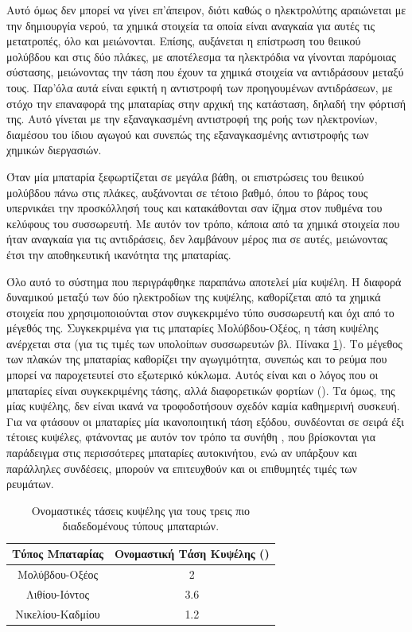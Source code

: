 \documentclass[12pt]{report}
\begin{document}
Αυτό όμως δεν μπορεί να γίνει επ'άπειρον, διότι καθώς ο ηλεκτρολύτης αραιώνεται με την δημιουργία νερού, τα χημικά στοιχεία τα οποία είναι αναγκαία για αυτές τις μετατροπές, όλο και μειώνονται. 
Επίσης, αυξάνεται η επίστρωση του θειικού μολύβδου και στις δύο πλάκες, με αποτέλεσμα τα ηλεκτρόδια να γίνονται παρόμοιας σύστασης, μειώνοντας την τάση που έχουν τα χημικά στοιχεία να αντιδράσουν μεταξύ τους. 
Παρ'όλα αυτά είναι εφικτή η αντιστροφή των προηγουμένων αντιδράσεων, με στόχο την επαναφορά της μπαταρίας στην αρχική της κατάσταση, δηλαδή την φόρτισή της. 
Αυτό γίνεται με την εξαναγκασμένη αντιστροφή της ροής των ηλεκτρονίων, διαμέσου του ίδιου αγωγού και συνεπώς της εξαναγκασμένης αντιστροφής των χημικών διεργασιών. 

Όταν μία μπαταρία ξεφωρτίζεται σε μεγάλα βάθη, οι επιστρώσεις του θειικού μολύβδου πάνω στις πλάκες, αυξάνονται σε τέτοιο βαθμό, όπου το βάρος τους υπερνικάει την προσκόλλησή τους και κατακάθονται σαν ίζημα στον πυθμένα του κελύφους
του συσσωρευτή. Με αυτόν τον τρόπο, κάποια από τα χημικά στοιχεία που ήταν αναγκαία για τις αντιδράσεις, δεν λαμβάνουν μέρος πια σε αυτές, μειώνοντας έτσι την αποθηκευτική ικανότητα της μπαταρίας.

Όλο αυτό το σύστημα που περιγράφθηκε παραπάνω αποτελεί μία κυψέλη. Η διαφορά δυναμικού μεταξύ των δύο ηλεκτροδίων της κυψέλης, καθορίζεται από τα χημικά στοιχεία που χρησιμοποιούνται στον συγκεκριμένο τύπο συσσωρευτή και όχι
από το μέγεθός της. 
Συγκεκριμένα για τις μπαταρίες Μολύβδου-Οξέος, η τάση κυψέλης ανέρχεται στα {} (για τις τιμές των υπολοίπων συσσωρευτών βλ. Πίνακα \ref{tab:battery}). Το μέγεθος των πλακών της μπαταρίας καθορίζει 
την αγωγιμότητα, συνεπώς και το ρεύμα που μπορεί να παροχετευτεί στο εξωτερικό κύκλωμα. Αυτός είναι και ο λόγος που οι μπαταρίες είναι συγκεκριμένης τάσης, αλλά διαφορετικών φορτίων ({}). 
Τα {} όμως, της μίας κυψέλης, δεν είναι ικανά να τροφοδοτήσουν σχεδόν καμία καθημερινή συσκευή. Για να φτάσουν οι μπαταρίες μία ικανοποιητική τάση εξόδου, συνδέονται σε σειρά έξι τέτοιες κυψέλες, 
φτάνοντας με αυτόν τον τρόπο τα συνήθη {}, που βρίσκονται για παράδειγμα στις περισσότερες μπαταρίες αυτοκινήτου, ενώ αν υπάρξουν και παράλληλες συνδέσεις, μπορούν να επιτευχθούν και οι επιθυμητές τιμές των ρευμάτων.

\begin{table}[h]
\centering
				\begin{tabular}{ |c|c| }
				\hline
				Tύπος Μπαταρίας & Ονομαστική Τάση Κυψέλης ({\latintext{V}}) \\
				\hline
				Μολύβδου-Οξέος & 2 \\
				Λιθίου-Ιόντος & 3.6 \\
				Νικελίου-Καδμίου & 1.2 \\
				\hline
				\end{tabular}
\captionsetup{width=0.8\textwidth}
\caption{Ονομαστικές τάσεις κυψέλης για τους τρεις πιο διαδεδομένους τύπους μπαταριών.}
\label{tab:battery}
\end{table}
\end{document}
